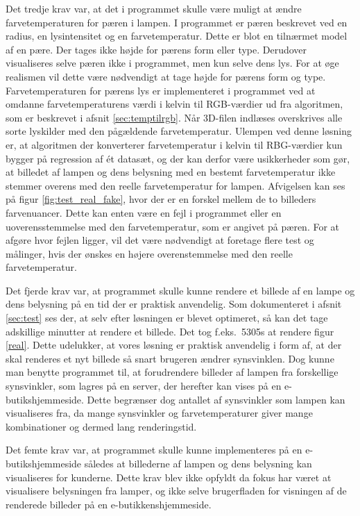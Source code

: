 Det tredje krav var, at det i programmet skulle være muligt at ændre farvetemperaturen for pæren i lampen. I programmet er pæren beskrevet ved en radius, en lysintensitet og en farvetemperatur. Dette er blot en tilnærmet model af en pære. Der tages ikke højde for pærens form eller type. Derudover visualiseres selve pæren ikke i programmet, men kun selve dens lys. For at øge realismen vil dette være nødvendigt at tage højde for pærens form og type.
Farvetemperaturen for pærens lys er implementeret i programmet ved at omdanne farvetemperaturens værdi i kelvin til RGB-værdier ud fra algoritmen, som er beskrevet i afsnit \ref{sec:temptilrgb}. Når 3D-filen indlæses overskrives alle sorte lyskilder med den pågældende farvetemperatur. Ulempen ved denne løsning er, at algoritmen der konverterer farvetemperatur i kelvin til RBG-værdier kun bygger på regression af ét datasæt, og der kan derfor være usikkerheder som gør, at billedet af lampen og dens belysning med en bestemt farvetemperatur ikke stemmer overens med den reelle farvetemperatur for lampen. Afvigelsen kan ses på figur \ref{fig:test_real_fake}, hvor der er en forskel mellem de to billeders farvenuancer. Dette kan enten være en fejl i programmet eller en uoverensstemmelse med den farvetemperatur, som er angivet på pæren. For at afgøre hvor fejlen ligger, vil det være nødvendigt at foretage flere test og målinger, hvis der ønskes en højere overenstemmelse med den reelle farvetemperatur.

Det fjerde krav var, at programmet skulle kunne rendere et billede af en lampe og dens belysning på en tid der er praktisk anvendelig. Som dokumenteret i afsnit \ref{sec:test} ses der, at selv efter løsningen er blevet optimeret, så kan det tage adskillige minutter at rendere et billede. Det tog f.eks.\ 5305s at rendere figur \ref{real}. Dette udelukker, at vores løsning er praktisk anvendelig i form af, at der skal renderes et nyt billede så snart brugeren ændrer synsvinklen. Dog kunne man benytte programmet til, at forudrendere billeder af lampen fra forskellige synsvinkler, som lagres på en server, der herefter kan vises på en e-butikshjemmeside. Dette begrænser dog antallet af synsvinkler som lampen kan visualiseres fra, da mange synsvinkler og farvetemperaturer giver mange kombinationer og dermed lang renderingstid. 

Det femte krav var, at programmet skulle kunne implementeres på en e-butikshjemmeside således at billederne af lampen og dens belysning kan visualiseres for kunderne. Dette krav blev ikke opfyldt da fokus har været at visualisere belysningen fra lamper, og ikke selve brugerfladen for visningen af de renderede billeder på en e-butikkenshjemmeside.  

